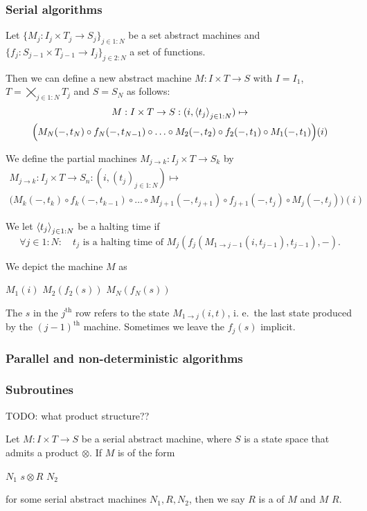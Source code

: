 \subsubsection{Serial algorithms}
\begin{definition}
Let $\{M_j: I_j\times T_j \to S_j\}_{j\in 1:N}$ be a set abstract machines and $\{f_j: S_{j-1}\times T_{j-1} \to I_{j}\}_{j\in 2:N}$ a set of functions.

Then we can define a new abstract machine $M: I\times T\to S$ with $I= I_1$, $T = \bigtimes_{j\in 1:N} T_j$ and $S = S_N$ as follows:
\begin{multline*}
M: I\times T \to S: (i, \left\langle t_j \right\rangle_{j\in 1:N}) \mapsto \\
\Big(M_N(-, t_N) \circ f_{N}(-, t_{N-1}) \circ \ldots \circ M_2(-, t_2) \circ f_2(-, t_1) \circ M_1(-, t_1)\Big)(i)
\end{multline*}

We define the partial machines $M_{j\to k}: I_j\times T \to S_k$ by
\begin{multline*}
M_{j\to k}: I_j\times T \to S_n: (i, (t_j)_{j\in 1:N}) \mapsto \\
\Big(M_k(-, t_k) \circ f_{k}(-, t_{k-1}) \circ \ldots \circ M_{j+1}(-, t_{j+1}) \circ f_{j+1}(-, t_j) \circ M_j(-, t_j)\Big)(i)
\end{multline*}

We let $\left\langle t_j \right\rangle_{j\in 1:N}$ be a halting time if
\[ \forall j\in 1:N: \quad \text{$t_j$ is a halting time of $M_j(f_j(M_{1\to j-1}(i, t_{j-1}), t_{j-1}), -)$}. \]

We depict the machine $M$ as
\begin{centeredAlgorithm}
$M_1(i)$\;
$M_2(f_2(s))$\;
\Dots
$M_N(f_N(s))$\;
\end{centeredAlgorithm}

The $s$ in the $j^\text{th}$ row refers to the state $M_{1\to j}(i, t)$, i. e.\ the last state produced by the $(j-1)^\text{th}$ machine. Sometimes we leave the $f_j(s)$ implicit.
\end{definition}


\subsubsection{Parallel and non-deterministic algorithms}

\subsubsection{Subroutines}
TODO: what product structure??
\begin{definition}
Let $M: I\times T\to S$ be a serial abstract machine, where $S$ is a state space that admits a product $\otimes$. 
If $M$ is of the form
\begin{centeredAlgorithm}
$N_1$\;
$s\otimes R$\;
$N_2$\;
\end{centeredAlgorithm}
for some serial abstract machines $N_1, R, N_2$, then we say $R$
is a  of $M$ and $M$  $R$.
\end{definition}

